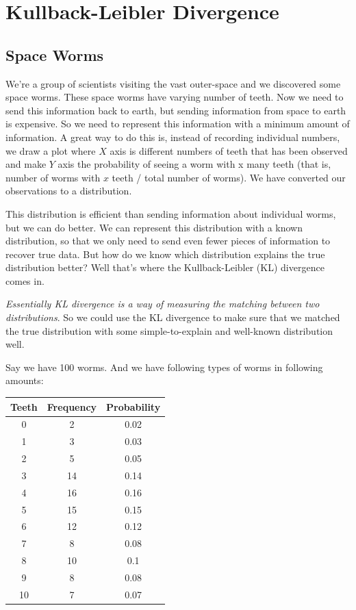 \chapter{Kullback-Leibler Divergence}

\section{Space Worms}
We’re a group of scientists visiting the vast outer-space and we discovered some space worms. These space worms have varying number of teeth. Now we need to send this information back to earth, but sending information from space to earth is expensive. So we need to represent this information with a minimum amount of information. A great way to do this is, instead of recording individual numbers, we draw a plot where $X$ axis is different numbers of teeth that has been observed and make $Y$ axis the probability of seeing a worm with x many teeth (that is, number of worms with $x$ teeth / total number of worms). We have converted our observations to a distribution.

This distribution is efficient than sending information about individual worms, but we can do better. We can represent this distribution with a known distribution, so that we only need to send even fewer pieces of information to recover true data. But how do we know which distribution explains the true distribution better? Well that’s where the Kullback-Leibler (KL) divergence comes in.

\emph{Essentially KL divergence is a way of measuring the matching between two distributions}. So we could use the KL divergence to make sure that we matched the true distribution with some simple-to-explain and well-known distribution well.

Say we have 100 worms. And we have following types of worms in following amounts:

\begin{table}[htbp]
\centering
\begin{tabular}{|c|c|c|}
\hline
Teeth & Frequency & Probability\\
\hline
\hline
0 & 2 & 0.02 \\
1 & 3 & 0.03 \\
2 & 5 & 0.05 \\
3 & 14 & 0.14 \\
4 & 16 & 0.16 \\
5 & 15 & 0.15 \\
6 & 12 & 0.12 \\
7 & 8  & 0.08 \\
8 & 10 & 0.1  \\
9 & 8  & 0.08 \\
10 & 7 & 0.07 \\
\hline
\end{tabular}
\end{table}

